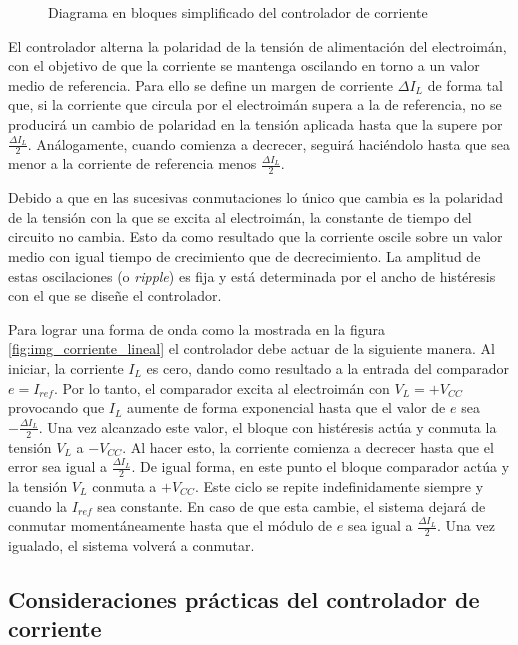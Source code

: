 \begin{figure}[H]
	\centering
	
	\caption{Diagrama en bloques simplificado del controlador de corriente}	\label{fig:img_diag-en-bloques}
\end{figure}

El controlador alterna la polaridad de la tensión de alimentación del electroimán, con el objetivo de que la corriente se mantenga oscilando en torno a un valor medio de referencia. Para ello se define un margen de corriente $\Delta I_L$ de forma tal que, si la corriente que circula por el electroimán supera a la de referencia, no se producirá un cambio de polaridad en la tensión aplicada hasta que la supere por $\frac{\Delta I_L}{2}$. Análogamente, cuando comienza a decrecer, seguirá haciéndolo hasta que sea menor a la corriente de referencia menos $\frac{\Delta I_L}{2}$.

Debido a que en las sucesivas conmutaciones lo único que cambia es la polaridad de la tensión con la que se excita al electroimán, la constante de tiempo del circuito no cambia. Esto da como resultado que la corriente oscile sobre un valor medio con igual tiempo de crecimiento que de decrecimiento. La amplitud de estas oscilaciones (o \textsl{ripple}) es fija y está determinada por el ancho de histéresis con el que se diseñe el controlador.

Para lograr una forma de onda como la mostrada en la  figura \ref{fig:img_corriente_lineal} el controlador debe actuar de la siguiente manera. Al iniciar, la corriente $I_L$ es cero, dando como resultado a la entrada del comparador  $e = I_{ref}$. Por lo tanto, el comparador excita al electroimán con $V_L=+V_{CC}$ provocando que $I_L$ aumente de forma exponencial hasta que el valor de $e$ sea $-\frac{\Delta I_L}{2}$. Una vez alcanzado este valor, el bloque con histéresis actúa y conmuta la tensión $V_L$ a $-V_{CC}$. Al hacer esto, la corriente comienza a decrecer hasta que el error sea igual a $\frac{\Delta I_L}{2}$. De igual forma, en este punto el bloque comparador actúa y la tensión $V_L$ conmuta a $+V_{CC}$. Este ciclo se repite indefinidamente siempre y cuando la $I_{ref}$ sea constante. En caso de que esta cambie, el sistema dejará de conmutar momentáneamente hasta que el módulo de $e$ sea igual a $\frac{\Delta I_L}{2}$. Una vez igualado, el sistema volverá a conmutar.

\subsection{Consideraciones prácticas del controlador de corriente}

